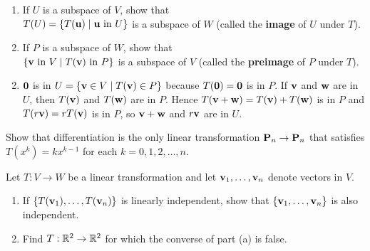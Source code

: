 \begin{multicols}{2}
\begin{ex}
\begin{enumerate}[label={\alph*.}]
\item If $U$ is a subspace of $V$, show that \\ $T(U) = \{T(\textbf{u}) \mid \textbf{u} \mbox{ in } U\}$ is a subspace of $W$ (called the \textbf{image} of $U$ under $T$).

\item If $P$ is a subspace of $W$, show that \\ $\{\textbf{v} \mbox{ in } V \mid T(\textbf{v}) \mbox{ in } P\}$ is a subspace of $V$ (called the \textbf{preimage} of $P$ under $T$).

\end{enumerate}
\begin{sol}
\begin{enumerate}[label={\alph*.}]
\setcounter{enumi}{1}
\item $\textbf{0}$ is in $U = \{\textbf{v} \in V \mid T(\textbf{v}) \in P\}$ because $T(\textbf{0}) = \textbf{0}$ is in $P$. If $\textbf{v}$ and $\textbf{w}$ are in $U$, then $T(\textbf{v})$ and $T(\textbf{w})$ are in $P$. Hence $T(\textbf{v} + \textbf{w}) = T(\textbf{v}) + T(\textbf{w})$ is in $P$ and $T(r\textbf{v}) = rT(\textbf{v})$ is in $P$, so $\textbf{v} + \textbf{w}$ and $r\textbf{v}$ are in $U$.

\end{enumerate}
\end{sol}
\end{ex}

\begin{ex}
Show that differentiation is the only linear transformation $\textbf{P}_{n} \to \textbf{P}_{n}$ that satisfies $T(x^{k}) = kx^{k-1}$ for each $k = 0, 1, 2, \dots, n$.
\end{ex}

\begin{ex}
Let $T : V \to W$ be a linear transformation and let $\textbf{v}_{1}, \dots, \textbf{v}_{n}$ denote vectors in $V$.


\begin{enumerate}[label={\alph*.}]
\item If $\{T(\textbf{v}_{1}), \dots, T(\textbf{v}_{n})\}$ is linearly independent, show that $\{\textbf{v}_{1}, \dots, \textbf{v}_{n}\}$ is also independent.

\item Find $T : \mathbb{R}^2 \to \mathbb{R}^2$ for which the converse of part (a) is false.

\end{enumerate}
\end{ex}


\end{multicols}
